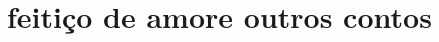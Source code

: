 \documentclass[11pt]{hedrabook}
\begin{document}
\ifodd\thepage\paginabranca\fi

\setcounter{tocdepth}{0}     %
\setcounter{secnumdepth}{-2} %

\hedratoc

\baselineskip=13.2pt   %


\part[feitiço de amor e outros contos]{feitiço de amor\break e outros contos} 




\ifdefined\printcheck\printcheck\fi
\end{document}
